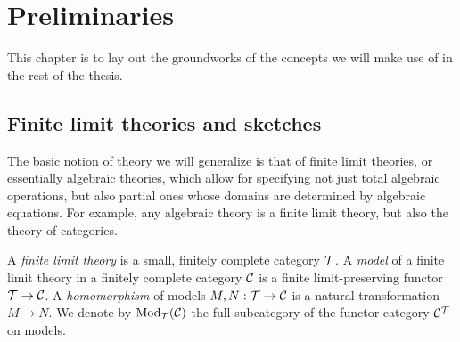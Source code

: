 \documentclass[../thesis.tex]{subfiles}
\begin{document}
\chapter{Preliminaries}\label{ch:prelims}
This chapter is to lay out the groundworks of the concepts we will make use of in the rest of the thesis.


\section{Finite limit theories and sketches}
The basic notion of theory we will generalize is that of finite limit theories, or essentially algebraic theories, which allow
for specifying not just total algebraic operations, but also partial ones whose domains are determined by algebraic equations.
For example, any algebraic theory is a finite limit theory, but also the theory of categories. 

\begin{definition}
  A \emph{finite limit theory} is a small, finitely complete category ${\mathcal{T}}$. A \emph{model} of a finite limit theory in a
  finitely complete category ${\mathcal{C}}$ is a finite limit-preserving functor ${\mathcal{T}} \to {\mathcal{C}}$. A \emph{homomorphism} of models
  $M, N : {\mathcal{T}} \to {\mathcal{C}}$ is a natural transformation $M \to N$. We denote by ${\mathrm{Mod}}_{\mathcal{T}}({\mathcal{C}})$ the full subcategory of
  the functor category ${\mathcal{C}}^{\mathcal{T}}$ on models.
\end{definition}
\begin{literature}
\end{literature}
\end{document}
